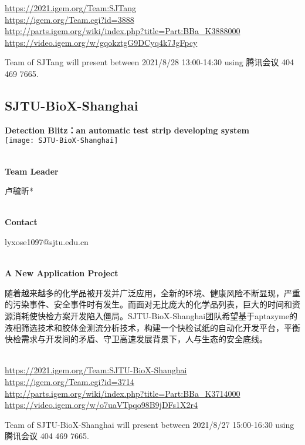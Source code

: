 \url{https://2021.igem.org/Team:SJTang }\\
\url{https://igem.org/Team.cgi?id=3888 }\\
\url{http://parts.igem.org/wiki/index.php?title=Part:BBa_K3888000 }\\
\url{https://video.igem.org/w/gqokztgG9DCyq4k7JgFpcy }\\

\vfill{}









Team of SJTang will present between      2021/8/28 13:00-14:30   using 腾讯会议 404 469 7665.
\newpage


\subsection{\textcolor{Blu}{ SJTU-BioX-Shanghai } }
\vspace{5mm}
\begin{center}
\large{
  \textbf{ Detection Blitz：an automatic test strip developing system }\\
  \texttt{[image: SJTU-BioX-Shanghai]}
}
\end{center}
\textbf{\\Team Leader}

  卢毓昕*


\textbf{\\Contact}

  lyxose1097@sjtu.edu.cn


\textbf{\\A New Application Project\\}\begin{spacing}{1.5}

随着越来越多的化学品被开发并广泛应用，全新的环境、健康风险不断显现，严重的污染事件、安全事件时有发生。而面对无比庞大的化学品列表，巨大的时间和资源消耗使快检方案开发陷入僵局。SJTU-BioX-Shanghai团队希望基于aptazyme的液相筛选技术和胶体金测流分析技术，构建一个快检试纸的自动化开发平台，平衡快检需求与开发间的矛盾、守卫高速发展背景下，人与生态的安全底线。\end{spacing}
\\

\url{https://2021.igem.org/Team:SJTU-BioX-Shanghai }\\
\url{https://igem.org/Team.cgi?id=3714 }\\
\url{http://parts.igem.org/wiki/index.php?title=Part:BBa_K3714000 }\\
\url{https://video.igem.org/w/o7uaVTpqo98B9jDFs1X2r4 }\\

\vfill{}









Team of SJTU-BioX-Shanghai will present between  2021/8/27 15:00-16:30       using 腾讯会议 404 469 7665.
\newpage

